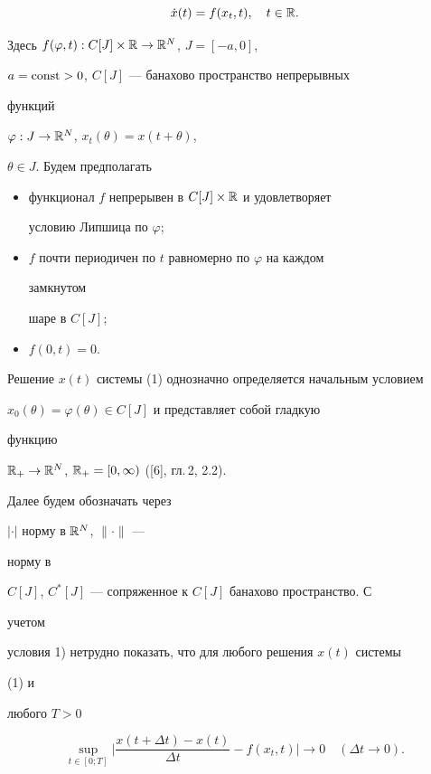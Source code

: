 \begin{equation}


\Dot x(t)=f(x_t,t),\quad t\in\Bbb R.


\end{equation}


Здесь $f(\varphi,t):C[J]\times\Bbb R\to\Bbb R^N$, $J=[-a,0]$,


$a=\operatorname{const}>0$, $C[J]$ --- банахово пространство непрерывных


функций


$\varphi:J\to\Bbb R^N$, $x_t(\theta)=x(t+\theta)$,


$\theta \in J$. Будем предполагать


\begin{itemize}


\item[1)] функционал $f$ непрерывен в $C[J]\times\Bbb R$ и удовлетворяет


условию Липшица по $\varphi$;


\item[2)] $f$ почти периодичен по $t$ равномерно по $\varphi$ на каждом


замкнутом


шаре в $C[J]$;


\item[3)] $f(0,t)=0$.


\end{itemize}


Решение $x(t)$ системы (1) однозначно определяется начальным условием


$x_0(\theta)=\varphi(\theta)\in C[J]$ и представляет собой гладкую


функцию


$\Bbb R_+\to\Bbb R^N$, $\Bbb R_+=[0,\infty )$ ([6], гл.\,2, 2.2).


Далее будем обозначать через


$|\cdot|$ норму в $\Bbb R^N$, $\|\cdot\|$ ---


норму в


$C[J]$, $C^*[J]$ --- сопряженное к $C[J]$ банахово пространство. С


учетом


условия 1) нетрудно показать, что для любого решения $x(t)$ системы


(1) и


любого $T>0$


\begin{equation}


\sup_{t\in [0;T]}\bigg|{\frac{x(t+\Delta t)-


x(t)}{\Delta t}-f(x_t,t)}\bigg|\to 0\quad (\Delta t\to 0).


\end{equation}





